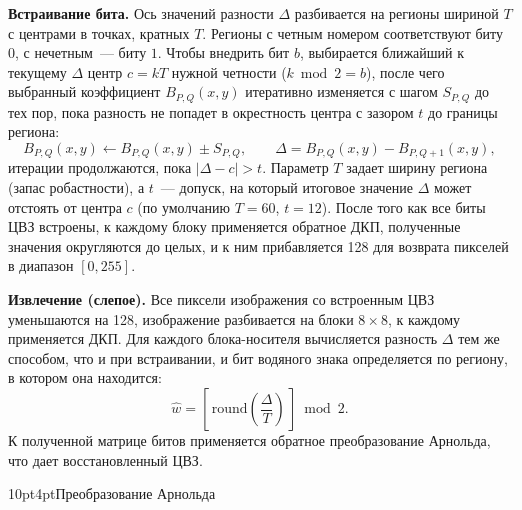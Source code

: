 \documentclass[12pt,a4paper]{article}
\makeatletter
\renewcommand\subsection{\@startsection{subsection}{2}{\z@}%
  {10pt}{4pt}{\normalfont\normalsize\bfseries}}
\makeatother
\begin{document}
\textbf{Встраивание бита.} Ось значений разности $\Delta$ разбивается на регионы шириной $T$ с центрами в точках, кратных $T$. Регионы с четным номером соответствуют биту $0$, с нечетным~--- биту $1$. Чтобы внедрить бит $b$, выбирается ближайший к текущему $\Delta$ центр $c = kT$ нужной четности ($k \bmod 2 = b$), после чего выбранный коэффициент $B_{P,Q}(x, y)$ итеративно изменяется с шагом $S_{P,Q}$ до тех пор, пока разность не попадет в окрестность центра с зазором $t$ до границы региона:
\begin{equation}
B_{P,Q}(x, y) \leftarrow B_{P,Q}(x, y) \pm S_{P,Q}, \qquad \Delta = B_{P,Q}(x, y) - B_{P,Q+1}(x, y),
\end{equation}
итерации продолжаются, пока $|\Delta - c| > t$. Параметр $T$ задает ширину региона (запас робастности), а $t$~--- допуск, на который итоговое значение $\Delta$ может отстоять от центра $c$ (по умолчанию $T = 60$, $t = 12$). После того как все биты ЦВЗ встроены, к каждому блоку применяется обратное ДКП, полученные значения округляются до целых, и к ним прибавляется 128 для возврата пикселей в диапазон $[0, 255]$.

\textbf{Извлечение (слепое).} Все пиксели изображения со встроенным ЦВЗ уменьшаются на 128, изображение разбивается на блоки $8 \times 8$, к каждому применяется ДКП. Для каждого блока-носителя вычисляется разность $\Delta$ тем же способом, что и при встраивании, и бит водяного знака определяется по региону, в котором она находится:
\begin{equation}
\widehat{w} = \left[\, \mathrm{round}\!\left( \frac{\Delta}{T} \right) \,\right] \bmod 2.
\end{equation}
К полученной матрице битов применяется обратное преобразование Арнольда, что дает восстановленный ЦВЗ.

\subsection{Преобразование Арнольда}
\end{document}
